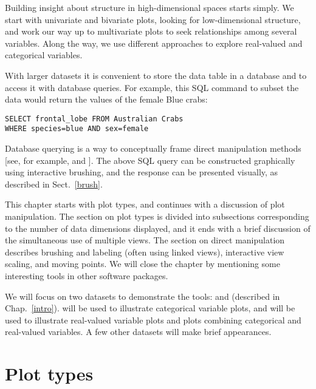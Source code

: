 Building insight about structure in high-dimensional spaces starts
simply.  We start with univariate and bivariate plots, looking for
low-dimensional structure, and work our way up to multivariate plots
to seek relationships among several variables.  Along the way, we use
different approaches to explore real-valued and categorical variables.

With larger datasets it is convenient to store the data table in a
database and to access it with database queries. For example, this SQL
command to subset the  data would return the 
values of the female Blue crabs:

\begin{verbatim}
SELECT frontal_lobe FROM Australian Crabs 
WHERE species=blue AND sex=female
\end{verbatim}

\noindent Database querying is a way to conceptually frame direct
manipulation methods [see, for example,  and
]. The above SQL query can be constructed
graphically using interactive brushing, and the
response can be presented visually, as described in Sect.~\ref{brush}.

This chapter starts with plot types, and continues with a discussion
of plot manipulation.  The section on plot types is divided into
subsections corresponding to the number of data dimensions displayed,
and it ends with a brief discussion of the simultaneous use of
multiple views.  The section on direct manipulation describes brushing
and labeling (often using linked views), interactive view scaling, and
moving points.  We will close the chapter by mentioning some interesting
tools in other software packages.


We will focus on two datasets to demonstrate the tools:  and  (described in Chap.~\ref{intro}).  
will be used to illustrate categorical variable plots, and
 will be used to illustrate real-valued variable plots and
plots combining categorical and real-valued variables.  A few other
datasets will make brief appearances.


\section{Plot types}
